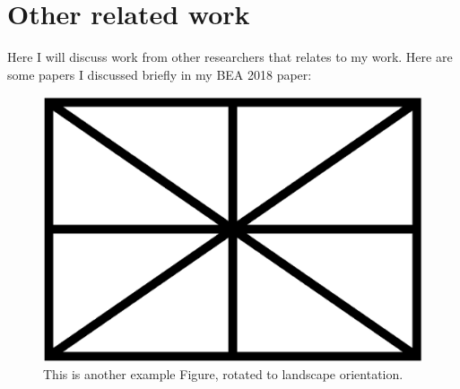 \section{Other related work}
Here I will discuss work from other researchers that relates to my work. Here are some papers I discussed briefly in my BEA 2018 paper:

\cite{leacock:ea:14}

\cite{kyle2015automatically}

\cite{weigle2013english}

\cite{amaral:meurers:user:07}

\cite{Meurers.Dickinson-17}

\cite{heift:schulze:07}

\cite{somasundaran:ea:15}

\cite{bailey:meurers:08}

\cite{meurers2011evaluating}

\cite{somasundaran:chodorow:14}

\cite{cahill-et-al:14}

\cite{ragheb:dickinson:14a}

\cite{foster2009native}

\cite{cho2013investigating}

\cite{landis1977measurement}

\cite{artstein:massimo:2008}

\cite{tetreault-chodorow:2008:HJCL}

\cite{tetreault:chodorow:08}

\begin{figure}
\includegraphics[width=\textwidth]{figures/exampleFigure.png}
\caption{This is another example Figure, rotated to landscape orientation.}
\label{LandscapeFigure}
\end{figure}
